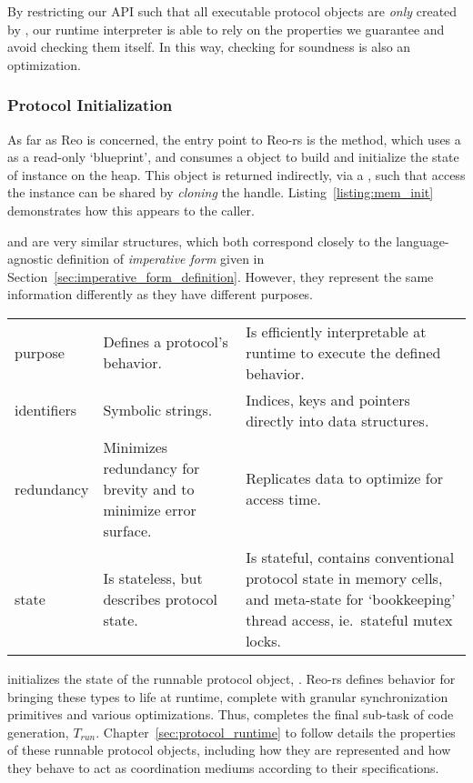 By restricting our API such that all executable protocol objects are \textit{only} created by , our runtime interpreter is able to rely on the properties we guarantee and avoid checking them itself. In this way, checking for soundness is also an optimization.


\subsubsection{Protocol Initialization}
As far as Reo is concerned, the entry point to Reo-rs is the  method, which uses a  as a read-only `blueprint', and consumes a  object to build and initialize the state of  instance on the heap. This object is returned indirectly, via a , such that access the  instance can be shared by \textit{cloning} the handle. Listing~\ref{listing:mem_init} demonstrates how this appears to the caller.

 and  are very similar structures, which both correspond closely to the language-agnostic definition of \textit{imperative form} given in Section~\ref{sec:imperative_form_definition}. However, they represent the same information differently as they have different purposes.

\noindent{}
\begin{footnotesize}
	\begin{tabular}{l|p{50mm}p{60mm}}
		& \code{ProtoDef}  & \code{Proto} \\
		\hline
		purpose & Defines a protocol's behavior. & Is efficiently interpretable at runtime to execute the defined behavior. \\
		identifiers & Symbolic strings. & Indices, keys and pointers directly into data structures. \\
		redundancy & Minimizes redundancy for brevity and to minimize error surface. & Replicates data to optimize for access time. \\
		state & Is stateless, but describes protocol state. & Is stateful, contains conventional protocol state in memory cells, and meta-state for `bookkeeping' thread access, ie.\ stateful mutex locks.
	\end{tabular}
\end{footnotesize}
\vspace{1em}

 initializes the state of the runnable protocol object, . Reo-rs defines behavior for bringing these types to life at runtime, complete with granular synchronization primitives and various optimizations. Thus,  completes the final sub-task of code generation, $T_{run}$. Chapter~\ref{sec:protocol_runtime} to follow details the properties of these runnable protocol objects, including how they are represented and how they behave to act as coordination mediums according to their  specifications.
